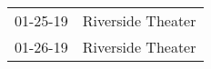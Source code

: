 \begin{supertabular}{p{0.07\textwidth}p{0.23\textwidth}}
 01-25-19 &  Riverside Theater \\
 01-26-19 &  Riverside Theater \\
\end{supertabular}
